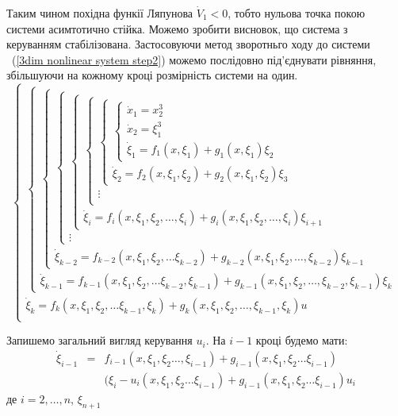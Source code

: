 \documentclass{article}
\begin{document}
Таким чином похідна функії Ляпунова $ \dot V_1 <0$, тобто нульова точка покою системи асимтотично 
стійка. Можемо зробити висновок, що система з керуванням стабілізована.
Застосовуючи метод зворотньго ходу до системи ~(\ref{3dim nonlinear system step2}) можемо послідовно під'єднувати
рівняння, збільшуючи на кожному кроці розмірність системи на один. 
\begin{equation}
{\begin{cases}
{\begin{cases}
{\begin{cases}
{\begin{cases}
{\begin{cases}
{\begin{cases}
{\begin{cases}
{\begin{cases}
\dot x_1 = x_2^3 \\
\dot x_2 = \xi_1^3\\
{\dot  {\xi}}_{1}=f_{1}(x,\xi_{1})+g_{1}(x,\xi_{1})\xi_{2}\end{cases}}\\
{\dot  {\xi}}_{2}=f_{2}(x,\xi_{1},\xi_{2})+g_{2}(x,\xi_{1},\xi_{2})\xi_{3}\end{cases}}\\\vdots \\\end{cases}}\\
{\dot  {\xi}}_{i}=f_{i}(x,\xi_{1},\xi_{2},\ldots ,\xi_{i})+g_{i}(x,\xi_{1},\xi_{2},\ldots ,\xi_{i})\xi_{{i+1}}\end{cases}}\\\vdots \end{cases}}\\
{\dot  {\xi}}_{{k-2}}=f_{{k-2}}(x,\xi_{1},\xi_{2},\ldots \xi_{{k-2}})+g_{{k-2}}(x,\xi_{1},\xi_{2},\ldots ,\xi_{{k-2}})\xi_{{k-1}}\end{cases}}\\
{\dot  {\xi}}_{{k-1}}=f_{{k-1}}(x,\xi_{1},\xi_{2},\ldots \xi_{{k-2}},\xi_{{k-1}})+g_{{k-1}}(x,\xi_{1},\xi_{2},\ldots ,\xi_{{k-2}},\xi_{{k-1}})\xi_{k}\end{cases}}\\
{\dot  {\xi}}_{k}=f_{k}(x,\xi_{1},\xi_{2},\ldots \xi_{{k-1}},\xi_{k})+g_{k}(x,\xi_{1},\xi_{2},\ldots ,\xi_{{k-1}},\xi_{k})u\\\end{cases}}
\end{equation}

Запишемо загальний вигляд керування $u_i$. На $i-1$ кроці будемо мати:
\begin{eqnarray}
    \dot \xi_{i-1} &=& f_{i-1}(x,\xi_1, \xi_2 \dots, \xi_{i-1}) +
    g_{i-1}(x, \xi_1, \xi_2 \dots \xi_{i-1})\nonumber\\
    &&(\xi_i - u_i(x, \xi_1, \xi_2 \dots \xi_{i-1})+
    g_{i-1}(x, \xi_1, \xi_2 \dots \xi_{i-1})u_i
\end{eqnarray}
де $i = 2, \dots, n$, $\xi_{n+1}$
\end{document}
